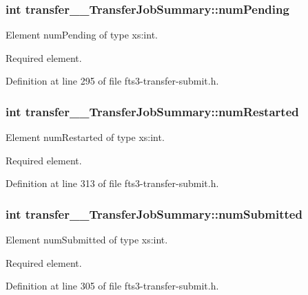 \subsubsection[{numPending}]{\setlength{\rightskip}{0pt plus 5cm}int {\bf transfer\_\-\_\-TransferJobSummary::numPending}}\label{classtransfer____TransferJobSummary_a35a2dc14a71dfcb35b0cfb2584378a9d}


Element numPending of type xs:int. 

Required element. 

Definition at line 295 of file fts3-\/transfer-\/submit.h.

\subsubsection[{numRestarted}]{\setlength{\rightskip}{0pt plus 5cm}int {\bf transfer\_\-\_\-TransferJobSummary::numRestarted}}\label{classtransfer____TransferJobSummary_a71fbb615e05eac647b920cfd4709a25b}


Element numRestarted of type xs:int. 

Required element. 

Definition at line 313 of file fts3-\/transfer-\/submit.h.

\subsubsection[{numSubmitted}]{\setlength{\rightskip}{0pt plus 5cm}int {\bf transfer\_\-\_\-TransferJobSummary::numSubmitted}}\label{classtransfer____TransferJobSummary_a650cf44332bd3fc168deec79f80a3edb}


Element numSubmitted of type xs:int. 

Required element. 

Definition at line 305 of file fts3-\/transfer-\/submit.h.

